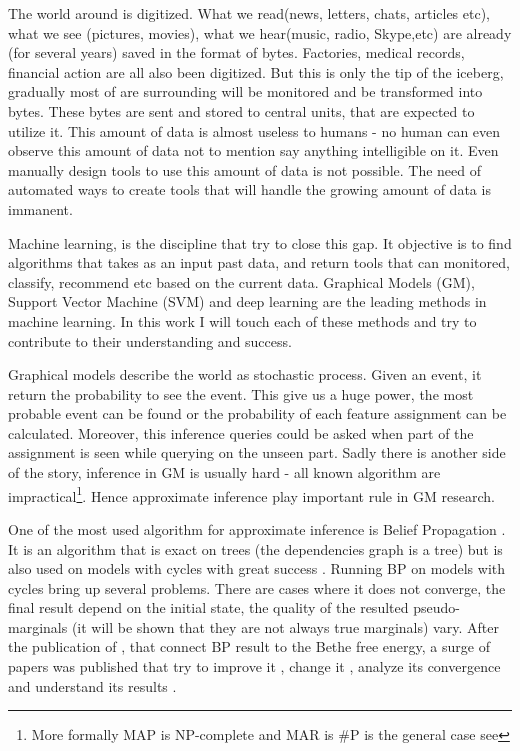 The world around is digitized.
What we read(news, letters, chats, articles etc), what we see (pictures, movies), what we hear(music, radio, Skype,etc) are already (for several years) saved in the format of bytes.
Factories, medical records, financial action are all also been digitized.
But this is only the tip of the iceberg, gradually most of are surrounding will be monitored and be transformed into  bytes.
These bytes are sent and stored to central units, that are expected to utilize it.
This amount of data is almost useless to humans - no human can even observe this amount of data not to mention say anything intelligible on it.
Even manually design tools to use this amount of data is not possible.
The need of automated ways to create tools that will handle the growing amount of data is immanent.   

Machine learning, is the discipline that try to close this gap.
It objective is to find algorithms that takes as an input past data, and return tools that can monitored, classify, recommend etc based on the current data.
Graphical Models (GM), Support Vector Machine (SVM) and deep learning are the leading methods in machine learning.
In this work I will touch each of these methods and try to contribute to their understanding and success.

Graphical models describe the world as stochastic process.
Given an event, it return the probability to see the event.
This give us a huge power, the most probable event can be found or the probability of each feature assignment can be calculated.
Moreover, this inference queries could be asked when part of the assignment is seen while querying on the unseen part.
Sadly there is another side of the story, inference in GM is usually hard - all known algorithm are impractical\footnote{More formally MAP is NP-complete and MAR is \#P is the general case see }.
Hence approximate inference play important rule in GM research.

One of the most used algorithm for approximate inference is Belief Propagation \cite{pearl1986fusion}.
It is an algorithm that is exact on trees (the dependencies graph is a tree) but is also used on models with cycles with great success \cite{willsky2002multiresolution,loeliger2004introduction,kschischang2003codes}.
Running BP on models with cycles bring up several problems.
There are cases where it does not converge, the final result depend on the initial state, the quality of the resulted pseudo-marginals (it will be shown that they are not always true marginals) vary.
After the publication of \cite{yedidia2000generalized}, that connect BP result to the Bethe free energy, a surge of papers was published that try to improve it \cite{elidan2012residual}, change it \cite{welling2001belief,wainwright2003tree,meshi2009convexifying}, analyze its convergence \cite{tatikonda2002loopy,mooij2007sufficient,roosta2008convergence} and understand its results \cite{heskes2002stable,yedidia2005constructing,AlanNips2007,YusukeNips2009,RuozziNips2012}.

